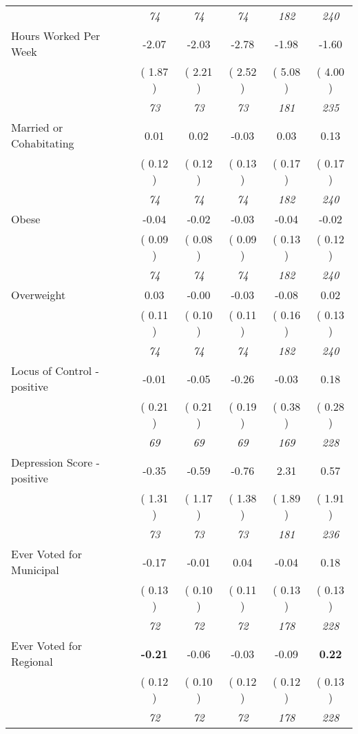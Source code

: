 \begin{tabular}{l c c c c c}
& \textit{ 74 } & \textit{ 74 } & \textit{ 74 } & \textit{ 182 } & \textit{ 240 } \\
Hours Worked Per Week &     -2.07 &     -2.03 &     -2.78 &     -1.98 &     -1.60 \\
& (     1.87 ) & (     2.21 ) & (     2.52 ) & (     5.08 ) & (     4.00 ) \\
& \textit{ 73 } & \textit{ 73 } & \textit{ 73 } & \textit{ 181 } & \textit{ 235 } \\
Married or Cohabitating &      0.01 &      0.02 &     -0.03 &      0.03 &      0.13 \\
& (     0.12 ) & (     0.12 ) & (     0.13 ) & (     0.17 ) & (     0.17 ) \\
& \textit{ 74 } & \textit{ 74 } & \textit{ 74 } & \textit{ 182 } & \textit{ 240 } \\
Obese &     -0.04 &     -0.02 &     -0.03 &     -0.04 &     -0.02 \\
& (     0.09 ) & (     0.08 ) & (     0.09 ) & (     0.13 ) & (     0.12 ) \\
& \textit{ 74 } & \textit{ 74 } & \textit{ 74 } & \textit{ 182 } & \textit{ 240 } \\
Overweight &      0.03 &     -0.00 &     -0.03 &     -0.08 &      0.02 \\
& (     0.11 ) & (     0.10 ) & (     0.11 ) & (     0.16 ) & (     0.13 ) \\
& \textit{ 74 } & \textit{ 74 } & \textit{ 74 } & \textit{ 182 } & \textit{ 240 } \\
Locus of Control - positive &     -0.01 &     -0.05 &     -0.26 &     -0.03 &      0.18 \\
& (     0.21 ) & (     0.21 ) & (     0.19 ) & (     0.38 ) & (     0.28 ) \\
& \textit{ 69 } & \textit{ 69 } & \textit{ 69 } & \textit{ 169 } & \textit{ 228 } \\
Depression Score - positive &     -0.35 &     -0.59 &     -0.76 &      2.31 &      0.57 \\
& (     1.31 ) & (     1.17 ) & (     1.38 ) & (     1.89 ) & (     1.91 ) \\
& \textit{ 73 } & \textit{ 73 } & \textit{ 73 } & \textit{ 181 } & \textit{ 236 } \\
Ever Voted for Municipal &     -0.17 &     -0.01 &      0.04 &     -0.04 &      0.18 \\
& (     0.13 ) & (     0.10 ) & (     0.11 ) & (     0.13 ) & (     0.13 ) \\
& \textit{ 72 } & \textit{ 72 } & \textit{ 72 } & \textit{ 178 } & \textit{ 228 } \\
Ever Voted for Regional & \textbf{     -0.21 } &     -0.06 &     -0.03 &     -0.09 & \textbf{      0.22 } \\
& (     0.12 ) & (     0.10 ) & (     0.12 ) & (     0.12 ) & (     0.13 ) \\
& \textit{ 72 } & \textit{ 72 } & \textit{ 72 } & \textit{ 178 } & \textit{ 228 } \\
\bottomrule
\end{tabular}
